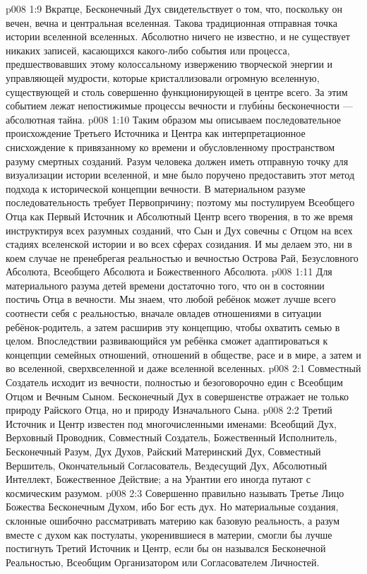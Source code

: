 \vs p008 1:9 Вкратце, Бесконечный Дух свидетельствует о том, что, поскольку он вечен, вечна и центральная вселенная. Такова традиционная отправная точка истории вселенной вселенных. Абсолютно ничего не известно, и не существует никаких записей, касающихся какого\hyp{}либо события или процесса, предшествовавших этому колоссальному извержению творческой энергии и управляющей мудрости, которые кристаллизовали огромную вселенную, существующей и столь совершенно функционирующей в центре всего. За этим событием лежат непостижимые процессы вечности и глуб\'ины бесконечности --- абсолютная тайна.
\vs p008 1:10 \pc Таким образом мы описываем последовательное происхождение Третьего Источника и Центра как интерпретационное снисхождение к привязанному ко времени и обусловленному пространством разуму смертных созданий. Разум человека должен иметь отправную точку для визуализации истории вселенной, и мне было поручено предоставить этот метод подхода к исторической концепции вечности. В материальном разуме последовательность требует Первопричину; поэтому мы постулируем Всеобщего Отца как Первый Источник и Абсолютный Центр всего творения, в то же время инструктируя всех разумных созданий, что Сын и Дух совечны с Отцом на всех стадиях вселенской истории и во всех сферах созидания. И мы делаем это, ни в коем случае не пренебрегая реальностью и вечностью Острова Рай, Безусловного Абсолюта, Всеобщего Абсолюта и Божественного Абсолюта.
\vs p008 1:11 Для материального разума детей времени достаточно того, что он в состоянии постичь Отца в вечности. Мы знаем, что любой ребёнок может лучше всего соотнести себя с реальностью, вначале овладев отношениями в ситуации ребёнок\hyp{}родитель, а затем расширив эту концепцию, чтобы охватить семью в целом. Впоследствии развивающийся ум ребёнка сможет адаптироваться к концепции семейных отношений, отношений в обществе, расе и в мире, а затем и во вселенной, сверхвселенной и даже вселенной вселенных.
\vs p008 2:1 Совместный Создатель исходит из вечности, полностью и безоговорочно един с Всеобщим Отцом и Вечным Сыном. Бесконечный Дух в совершенстве отражает не только природу Райского Отца, но и природу Изначального Сына.
\vs p008 2:2 \pc Третий Источник и Центр известен под многочисленными именами: Всеобщий Дух, Верховный Проводник, Совместный Создатель, Божественный Исполнитель, Бесконечный Разум, Дух Духов, Райский Материнский Дух, Совместный Вершитель, Окончательный Согласователь, Вездесущий Дух, Абсолютный Интеллект, Божественное Действие; а на Урантии его иногда путают с космическим разумом.
\vs p008 2:3 Совершенно правильно называть Третье Лицо Божества Бесконечным Духом, ибо Бог есть дух. Но материальные создания, склонные ошибочно рассматривать материю как базовую реальность, а разум вместе с духом как постулаты, укоренившиеся в материи, смогли бы лучше постигнуть Третий Источник и Центр, если бы он назывался Бесконечной Реальностью, Всеобщим Организатором или Согласователем Личностей.
